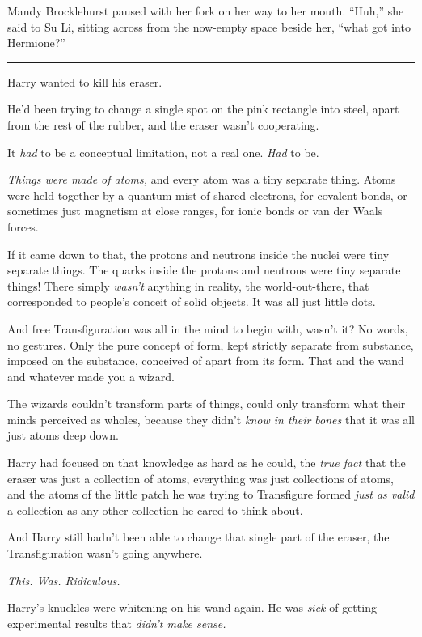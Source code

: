 Mandy Brocklehurst paused with her fork on her way to her mouth. ``Huh,'' she said to Su Li, sitting across from the now-empty space beside her, ``what got into Hermione?''

\begin{center}\rule{3in}{0.4pt}\end{center}

Harry wanted to kill his eraser.

He'd been trying to change a single spot on the pink rectangle into steel, apart from the rest of the rubber, and the eraser wasn't cooperating.

It \emph{had} to be a conceptual limitation, not a real one. \emph{Had} to be.

\emph{Things were made of atoms,} and every atom was a tiny separate thing. Atoms were held together by a quantum mist of shared electrons, for covalent bonds, or sometimes just magnetism at close ranges, for ionic bonds or van der Waals forces.

If it came down to that, the protons and neutrons inside the nuclei were tiny separate things. The quarks inside the protons and neutrons were tiny separate things! There simply \emph{wasn't} anything in reality, the world-out-there, that corresponded to people's conceit of solid objects. It was all just little dots.

And free Transfiguration was all in the mind to begin with, wasn't it? No words, no gestures. Only the pure concept of form, kept strictly separate from substance, imposed on the substance, conceived of apart from its form. That and the wand and whatever made you a wizard.

The wizards couldn't transform parts of things, could only transform what their minds perceived as wholes, because they didn't \emph{know in their bones} that it was all just atoms deep down.

Harry had focused on that knowledge as hard as he could, the \emph{true fact} that the eraser was just a collection of atoms, everything was just collections of atoms, and the atoms of the little patch he was trying to Transfigure formed \emph{just as valid} a collection as any other collection he cared to think about.

And Harry still hadn't been able to change that single part of the eraser, the Transfiguration wasn't going anywhere.

\emph{This. Was. Ridiculous.}

Harry's knuckles were whitening on his wand again. He was \emph{sick} of getting experimental results that \emph{didn't make sense.}

